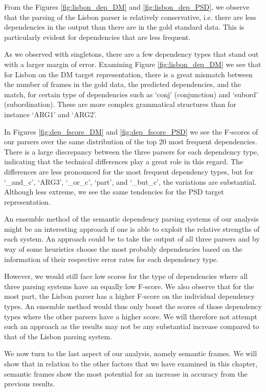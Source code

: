 From the Figures \ref{fig:lisbon_dep_DM} and \ref{fig:lisbon_dep_PSD}, we observe that the parsing of the Lisbon parser is relatively conservative, i.e. there are less dependencies in the output than there are in the gold standard data. This is particularly evident for dependencies that are less frequent.

As we observed with singletons, there are a few dependency types that stand out with a larger margin of error. Examining Figure \ref{fig:lisbon_dep_DM} we see that for Lisbon on the DM target representation, there is a great mismatch between the number of frames in the gold data, the predicted dependencies, and the match, for certain type of dependencies such as `conj' (conjunction) and `subord' (subordination). These are more complex grammatical structures than for instance `ARG1' and `ARG2'.

In Figures \ref{fig:dep_fscore_DM} and \ref{fig:dep_fscore_PSD} we see the F-scores of our parsers over the same distribution of the top 20 most frequent dependencies. There is a large discrepancy between the three parsers for each dependency type, indicating that the technical differences play a great role in this regard. The differences are less pronounced for the most frequent dependency types, but for `\_and\_c', `ARG3', `\_or\_c', `part', and `\_but\_c', the variations are substantial. Although less extreme, we see the same tendencies for the PSD target representation.

An ensemble method of the semantic dependency parsing systems of our analysis might be an interesting approach if one is able to exploit the relative strengths of each system. An approach could be to take the output of all three parsers and by way of some heuristics choose the most probably dependencies based on the information of their respective error rates for each dependency type. 

However, we would still face low scores for the type of dependencies where all three parsing systems have an equally low F-score. We also observe that for the most part, the Lisbon parser has a higher F-score on the individual dependency types. An ensemble method would thus only boost the scores of those dependency types where the other parsers have a higher score. We will therefore not attempt such an approach as the results may not be any substantial increase compared to that of the Lisbon parsing system.

We now turn to the last aspect of our analysis, namely semantic frames. We will show that in relation to the other factors that we have examined in this chapter, semantic frames show the most potential for an increase in accuracy from the previous results.


















